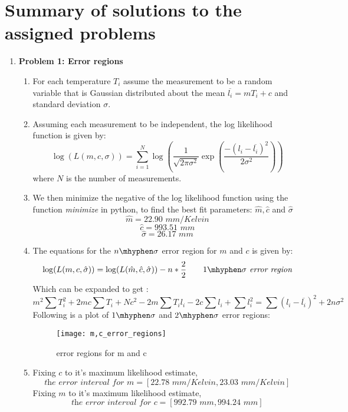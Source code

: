\documentclass{article}
\begin{document}
\section{Summary of solutions to the assigned problems}
    \begin{enumerate}
        \item {\textbf {Problem 1: Error regions}}
        \begin{enumerate}
            \item For each temperature $T_i$ assume the measurement to be a random variable that is Gaussian distributed about the mean $\overline{l_i} = mT_i + c $ and standard deviation $\sigma$.
            \item Assuming each measurement to be independent, the log likelihood function is given by:
            \[
                \log (L(m,c,\sigma)) = \sum_{i=1}^N \log \left( \frac{1}{\sqrt{2\pi \sigma ^2}} \exp \left(\frac{-(l_i-\overline{l_i})^2}{2 \sigma ^2} \right) \right)
            \]
            where $N$ is the number of measurements.
            \item We then minimize the negative of the log likelihood function using the function \emph{minimize} in python, to find the best fit parameters: $\hat{m},\hat{c} $ and $\hat{\sigma}$
            \[
                \hat{m} = 22.90 \textit{ mm/Kelvin}
            \]
            \[
                \hat{c} = 993.51 \textit{ mm}
            \]
            \[
                \hat{\sigma} = 26.17 \textit{ mm}
            \]
            \item The equations for the $n\mhyphen \sigma$ error region for $m$ and $c$ is given by:
            \[
                \log (L(m,c,\hat{\sigma})) = \log (L(\hat{m},\hat{c},\hat{\sigma})) - n*\frac{2}{2} \qquad 1\mhyphen \sigma \textit{ error region}
            \]
            Which can be expanded to get :
            \[
                m^2\sum T_i^2 + 2mc\sum T_i + Nc^2 - 2m\sum T_il_i - 2c \sum l_i + \sum l_i^2 = \sum (l_i - \overline{l_i})^2 + 2n\sigma ^2
            \]
            Following is a plot of $1\mhyphen \sigma$ and $2\mhyphen \sigma$ error regions:
            \begin{figure}[!htb]
                    \centering
                \texttt{[image: m,c\_error\_regions]}
                    \caption{error regions for m and c}
                    
            \end{figure}
        \newpage{}
            \item
            Fixing $c$ to it's maximum likelihood estimate, 
            \[
                \textit{the error interval for } m = [22.78\textit{ mm/Kelvin},23.03 \textit{ mm/Kelvin}]
            \]
            Fixing $m$ to it's maximum likelihood estimate, 
            \[
                \textit{the error interval for } c = [992.79\textit{ mm},994.24 \textit{ mm}]
            \]
            

\end{enumerate}
\end{enumerate}
\end{document}
